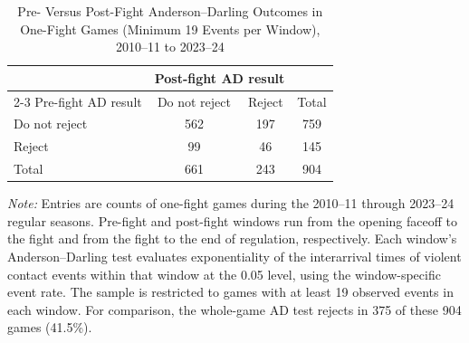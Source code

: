 \begin{table}[htbp]
\centering
\caption{Pre- Versus Post-Fight Anderson--Darling Outcomes in One-Fight Games (Minimum 19 Events per Window), 2010--11 to 2023--24}
\label{tab:one_fight_AD_rejection_min_19_20102011_20232024}
\small
\renewcommand{\arraystretch}{1.15}
\setlength{\tabcolsep}{6pt}

\begin{tabular*}{0.78\textwidth}{@{\extracolsep{\fill}}lccc}
\toprule
 & \multicolumn{2}{c}{Post-fight AD result} & \\
\cmidrule(lr){2-3}
Pre-fight AD result & Do not reject & Reject & Total \\
\midrule
Do not reject & 562 & 197 & 759 \\
Reject & 99 & 46 & 145 \\
\midrule
Total & 661 & 243 & 904 \\
\bottomrule
\end{tabular*}

\vspace{0.4em}
\parbox{0.78\textwidth}{
\footnotesize
\textit{Note:} Entries are counts of one-fight games during the 2010--11 through 2023--24 regular seasons. Pre-fight and post-fight windows run from the opening faceoff to the fight and from the fight to the end of regulation, respectively. Each window's Anderson--Darling test evaluates exponentiality of the interarrival times of violent contact events within that window at the 0.05 level, using the window-specific event rate. The sample is restricted to games with at least 19 observed events in each window. For comparison, the whole-game AD test rejects in 375 of these 904 games (41.5\%).
}
\end{table}
